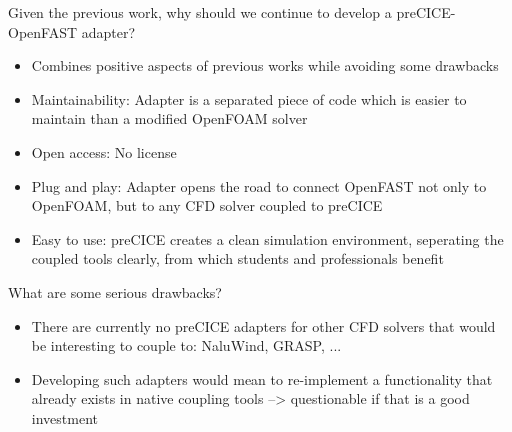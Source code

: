 Given the previous work, why should we continue to develop a preCICE-OpenFAST adapter?
\begin{itemize}
	\item Combines positive aspects of previous works while avoiding some drawbacks
	\item Maintainability: Adapter is a separated piece of code which is easier to maintain than a modified OpenFOAM solver
	\item Open access: No license
	\item Plug and play: Adapter opens the road to connect OpenFAST not only to OpenFOAM, but to any CFD solver coupled to preCICE
	\item Easy to use: preCICE creates a clean simulation environment, seperating the coupled tools clearly, from which students and professionals benefit
\end{itemize}
What are some serious drawbacks?
\begin{itemize}
	\item There are currently no preCICE adapters for other CFD solvers that would be interesting to couple to: NaluWind, GRASP, ...
	\item Developing such adapters would mean to re-implement a functionality that already exists in native coupling tools --> questionable if that is a good investment
\end{itemize}
